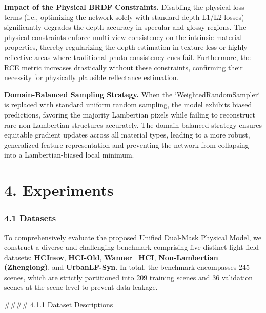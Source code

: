 \documentclass[journal]{IEEEtran}
\begin{document}
\textbf{Impact of the Physical BRDF Constraints.} 
Disabling the physical loss terms (i.e., optimizing the network solely with standard depth L1/L2 losses) significantly degrades the depth accuracy in specular and glossy regions. The physical constraints enforce multi-view consistency on the intrinsic material properties, thereby regularizing the depth estimation in texture-less or highly reflective areas where traditional photo-consistency cues fail. Furthermore, the RCE metric increases drastically without these constraints, confirming their necessity for physically plausible reflectance estimation.

\textbf{Domain-Balanced Sampling Strategy.} 
When the `WeightedRandomSampler` is replaced with standard uniform random sampling, the model exhibits biased predictions, favoring the majority Lambertian pixels while failing to reconstruct rare non-Lambertian structures accurately. The domain-balanced strategy ensures equitable gradient updates across all material types, leading to a more robust, generalized feature representation and preventing the network from collapsing into a Lambertian-biased local minimum.

\section{4. Experiments}

\subsubsection{4.1 Datasets}

To comprehensively evaluate the proposed Unified Dual-Mask Physical Model, we construct a diverse and challenging benchmark comprising five distinct light field datasets: \textbf{HCInew}, \textbf{HCI-Old}, \textbf{Wanner_HCI}, \textbf{Non-Lambertian (Zhenglong)}, and \textbf{UrbanLF-Syn}. In total, the benchmark encompasses 245 scenes, which are strictly partitioned into 209 training scenes and 36 validation scenes at the scene level to prevent data leakage. 

\#\#\#\# 4.1.1 Dataset Descriptions
\end{document}

